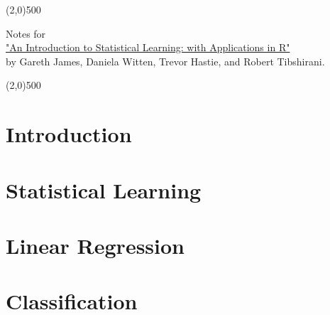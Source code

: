 \documentclass[a4paper,12pt,titlepage]{article} %
\begin{document}
\begin{titlepage}

\begin{center}
	\line(2,0){500}
\end{center}

\vspace{60pt}

\begin{center}	
	{\Large{Notes for}}\\
	\vspace{20pt}
	\href{http://www.springer.com/us/book/9781461471370}{\Huge{"An Introduction to Statistical Learning: with Applications in R"}}\\
	\vspace{20pt}
	{\LARGE{by Gareth James, Daniela Witten, Trevor Hastie, and Robert Tibshirani.}}\\
	\vspace{20pt}

\end{center}

\vspace{\fill}
\begin{center}
	\line(2,0){500}
\end{center}

\end{titlepage}

\tableofcontents
\newpage
\section{Introduction}


\newpage
\section{Statistical Learning}


\newpage
\section{Linear Regression}


\newpage
\section{Classification}
\end{document}

